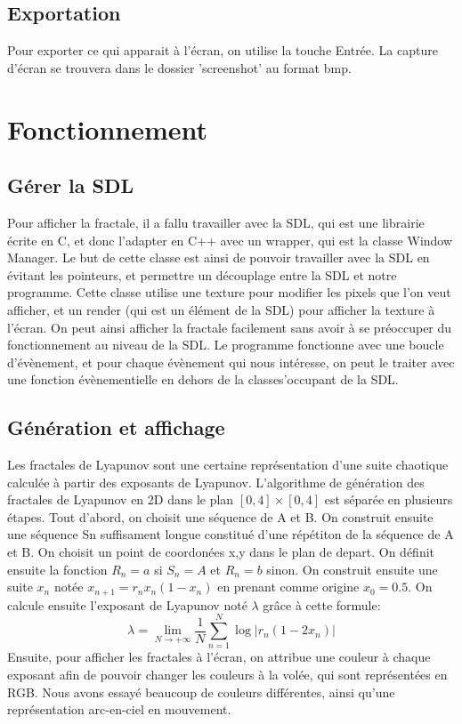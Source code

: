 \documentclass{article}
\begin{document}
	\subsection{Exportation}
	Pour exporter ce qui apparait à l'écran, on utilise la touche Entrée.
	La capture d'écran se trouvera dans le dossier 'screenshot' au format bmp.
	\section{Fonctionnement}
	\subsection{Gérer la SDL}
	Pour afficher la fractale, il a fallu travailler avec la SDL, qui est une librairie écrite en C, et donc l'adapter en C++ avec un wrapper, qui est la classe Window Manager.
	Le but de cette classe est ainsi de pouvoir travailler avec la SDL en évitant les pointeurs, et permettre un découplage entre la SDL et notre programme.
	Cette classe utilise une texture pour modifier les pixels que l'on veut afficher, et un render (qui est un élément de la SDL) pour afficher la texture à l'écran.
	On peut ainsi afficher la fractale facilement sans avoir à se préoccuper du fonctionnement au niveau de la SDL.
	Le programme fonctionne avec une boucle d'évènement, et pour chaque évènement qui nous intéresse, on peut le traiter avec une fonction évènementielle en dehors de la classes'occupant de la SDL.

	\subsection{Génération et affichage}
	Les fractales de Lyapunov sont une certaine représentation d'une suite chaotique calculée à partir des exposants de Lyapunov.
	L'algorithme de génération des fractales de Lyapunov en 2D dans le plan $[0,4] \times [0,4]$ est séparée en plusieurs étapes.
	Tout d'abord, on choisit une séquence de A et B.
	On construit ensuite une séquence Sn suffisament longue constitué d'une répétiton de la séquence de A et B.
	On choisit un point de coordonées x,y dans le plan de depart.
	On définit ensuite la fonction $R_n = a$ si $ S_n = A $ et $R_n = b$ sinon.
	On construit ensuite une suite $x_n$ notée $x_{{n+1}}=r_{n}x_{n}(1-x_{n})$ en prenant comme origine $x_0 = 0.5$.
	On calcule ensuite l'exposant de Lyapunov noté $\lambda$ grâce à cette formule:
	\[
		\lambda = \lim_{N \to +\infty} \frac{1}{N} \sum_{n=1}^{N} \log | r_n(1-2x_n) |
	\]
	Ensuite, pour afficher les fractales à l'écran, on attribue une couleur à chaque exposant afin de pouvoir changer les couleurs à la volée, qui sont représentées en RGB.
	Nous avons essayé beaucoup de couleurs différentes, ainsi qu'une représentation arc-en-ciel en mouvement.
\end{document}

